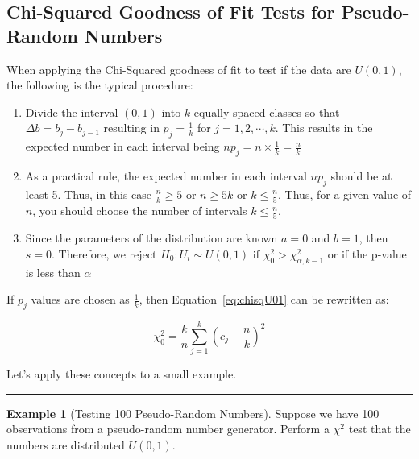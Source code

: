 \documentclass[
]{book}
\theoremstyle{definition}
\theoremstyle{definition}
\newtheorem{example}{Example}[chapter]
\theoremstyle{definition}
\theoremstyle{definition}
\theoremstyle{remark}
\begin{document}
\hypertarget{chi-squared-goodness-of-fit-tests-for-pseudo-random-numbers}{%
\subsection{Chi-Squared Goodness of Fit Tests for Pseudo-Random Numbers}\label{chi-squared-goodness-of-fit-tests-for-pseudo-random-numbers}}

When applying the Chi-Squared goodness of fit to test if the data are \(U(0,1)\), the following is the typical procedure:

\begin{enumerate}
\def\labelenumi{\arabic{enumi}.}
\item
  Divide the interval \((0,1)\) into \(k\) equally spaced classes so that
  \(\Delta b = b_{j} - b_{j-1}\) resulting in \(p_{j} = \frac{1}{k}\) for
  \(j=1, 2, \cdots, k\). This results in the expected number in each
  interval being \(np_{j} = n \times \frac{1}{k} = \frac{n}{k}\)
\item
  As a practical rule, the expected number in each interval \(np_{j}\)
  should be at least 5. Thus, in this case \(\frac{n}{k} \geq 5\) or
  \(n \geq 5k\) or \(k \leq \frac{n}{5}\). Thus, for a given value of \(n\),
  you should choose the number of intervals \(k \leq \frac{n}{5}\),
\item
  Since the parameters of the distribution are known \(a=0\) and \(b=1\),
  then \(s=0\). Therefore, we reject \(H_{0}: U_{i} \sim U(0,1)\) if
  \(\chi^{2}_{0} > \chi^{2}_{\alpha, k-1}\) or if the p-value is less
  than \(\alpha\)
\end{enumerate}

If \(p_{j}\) values are chosen as \(\frac{1}{k}\), then
Equation~\eqref{eq:chisqU01} can be rewritten as:

\begin{equation}
\chi^{2}_{0} = \frac{k}{n}\sum\limits_{j=1}^{k} \left( c_{j} - \frac{n}{k} \right)^{2}
\label{eq:chisqU01}
\end{equation}

Let's apply these concepts to a small example.

\begin{center}\rule{0.5\linewidth}{0.5pt}\end{center}

\begin{example}[Testing 100 Pseudo-Random Numbers]
\protect\hypertarget{exm:TestU01}{}{\label{exm:TestU01} {} }Suppose we have 100 observations from a pseudo-random number generator. Perform a \(\chi^{2}\)
test that the numbers are distributed \(U(0,1)\).
\end{example}
\end{document}
